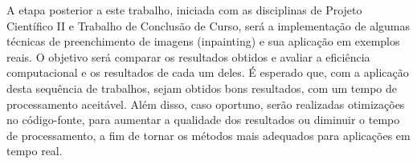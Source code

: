 A etapa posterior a este trabalho, iniciada com as disciplinas de Projeto Científico II e Trabalho de Conclusão de Curso, será a implementação de algumas técnicas de preenchimento de imagens (inpainting) e sua aplicação em exemplos reais. O objetivo será comparar os resultados obtidos e avaliar a eficiência computacional e os resultados de cada um deles. É esperado que, com a aplicação desta sequência de trabalhos, sejam obtidos bons resultados, com um tempo de processamento aceitável. Além disso, caso oportuno, serão realizadas otimizações no código-fonte, para aumentar a qualidade dos resultados ou diminuir o tempo de processamento, a fim de tornar os métodos mais adequados para aplicações em tempo real.

